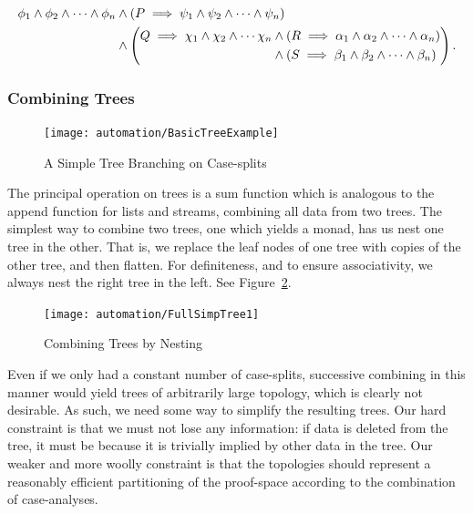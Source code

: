 \begin{align}\label{eq:CaseAnalysisTreeFormula}
\phi_1 \wedge \phi_2 \wedge \cdots \wedge \phi_n &\wedge (P \implies \psi_1 \wedge \psi_2 \wedge \cdots \wedge \psi_n)\notag\\
&\wedge \left(\begin{aligned} Q \implies \chi_1 \wedge \chi_2 \wedge \cdots \chi_n &\wedge (R \implies \alpha_1 \wedge \alpha_2 \wedge \cdots \wedge \alpha_n)\\ &\wedge (S \implies \beta_1 \wedge \beta_2 \wedge \cdots \wedge \beta_n)\end{aligned}\right).
\end{align}

\subsubsection{Combining Trees}\label{fig:CombiningTrees}
\begin{figure}
\centering\texttt{[image: automation/BasicTreeExample]}
\caption{A Simple Tree Branching on Case-splits}
\label{fig:BasicTreeExample}
\end{figure}

The principal operation on trees is a sum function which is analogous to the append function for lists and streams, combining all data from two trees. The simplest way to combine two trees, one which yields a monad, has us nest one tree in the other. That is, we replace the leaf nodes of one tree with copies of the other tree, and then flatten. For definiteness, and to ensure associativity, we always nest the right tree in the left. See Figure~\ref{fig:TreeNesting}.

\begin{figure}
\centering\texttt{[image: automation/FullSimpTree1]}
\caption{Combining Trees by Nesting}
\label{fig:TreeNesting}
\end{figure}

Even if we only had a constant number of case-splits, successive combining in this manner would yield trees of arbitrarily large topology, which is clearly not desirable. As such, we need some way to simplify the resulting trees. Our hard constraint is that we must not lose any information: if data is deleted from the tree, it must be because it is trivially implied by other data in the tree. Our weaker and more woolly constraint is that the topologies should represent a reasonably efficient partitioning of the proof-space according to the combination of case-analyses. 

